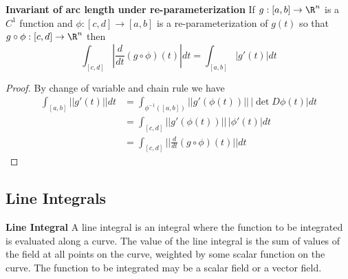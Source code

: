 \documentclass[11pt]{article}
\begin{document}
\begin{proposition*}
  \textbf{Invariant of arc length under re-parameterization} If $g:[a,b]\to \R^n$ is a $C^1$ function and $\phi:[c,d]\to [a,b]$ is a re-parameterization of $g(t)$ so that $g\circ \phi: [c,d]\to\R^n$ then
  \[
    \int_{[c,d]} \left| \frac{d}{dt} (g\circ \phi)(t) \right| dt = \int_{[a,b]} |g'(t)|dt
  \]
  \begin{proof} By change of variable and chain rule we have
    \begin{align*}
      \int_{[a,b]} ||g'(t)||dt &= \int_{\phi^{-1}([a,b])} ||g'(\phi(t))||\,|\det D\phi(t)|dt\\
      &=\int_{[c,d]} ||g'(\phi(t))||\, |\phi'(t)|dt\\
      &= \int_{[c,d]} || \frac{d}{dt} (g\circ \phi)(t)||dt
    \end{align*}
  \end{proof}
\end{proposition*}


\subsection*{Line Integrals}

\begin{defn*}
  \textbf{Line Integral} A line integral is an integral where the function to be integrated is evaluated along a curve. The value of the line integral is the sum of values of the field at all points on the curve, weighted by some scalar function on the curve.
  The function to be integrated may be a scalar field or a vector field.
\end{defn*}
\end{document}
